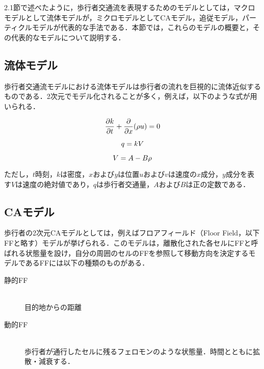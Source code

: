2.1節で述べたように，歩行者交通流を表現するためのモデルとしては，マクロモデルとして流体モデルが，ミクロモデルとしてCAモデル，追従モデル，パーティクルモデルが代表的な手法である．本節では，これらのモデルの概要と，その代表的なモデルについて説明する．

\subsection{流体モデル}

歩行者交通流モデルにおける流体モデルは歩行者の流れを巨視的に流体近似するものである．2次元でモデル化されることが多く，例えば，以下のような式が用いられる\cite{continum_theory}．

\begin{equation}
 \frac{\partial k}{\partial t} + \frac{\partial}{\partial x} (\rho u) = 0\\
\end{equation}

\begin{equation}
 q = kV \\
\end{equation}

\begin{equation}
 V = A - B\rho \\
\end{equation}

ただし，$t$時刻，$k$は密度，$x$および$y$は位置$u$および$v$は速度の$x$成分，$y$成分を表す$V$は速度の絶対値であり，$q$は歩行者交通量，$A$および$B$は正の定数である．

\subsection{CAモデル}

歩行者の2次元CAモデルとしては，例えばフロアフィールド（Floor Field，以下FFと略す）モデルが挙げられる\cite{floor_field_model}．このモデルは，離散化された各セルにFFと呼ばれる状態量を設け，自分の周囲のセルのFFを参照して移動方向を決定するモデルであるFFには以下の種類のものがある．\\

\begin{description}
  \item[静的FF]\mbox{}\\
  目的地からの距離
  \item[動的FF]\mbox{}\\
  歩行者が通行したセルに残るフェロモンのような状態量．時間とともに拡散・減衰する．
\end{description}

